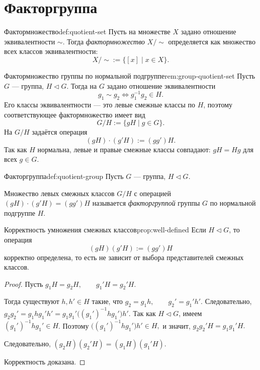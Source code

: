 
\section{Факторгруппа}

\begin{Definition}{Фактормножество}{def:quotient-set}
	Пусть на множестве $X$ задано отношение эквивалентности $\sim$. Тогда \emph{фактормножество} $X/{\sim}$ определяется как множество всех классов эквивалентности:
	\[
	X/{\sim}:=\{[x] \mid x\in X\}.
	\]
\end{Definition}

\begin{Remark}{Фактормножество группы по нормальной подгруппе}{rem:group-quotient-set}
	Пусть $G$ --- группа, $H \triangleleft G$. Тогда на $G$ задано отношение эквивалентности
	\[
	g_1\sim g_2 \Longleftrightarrow g_1^{-1}g_2\in H.
	\]
	Его классы эквивалентности --- это левые смежные классы по $H$, поэтому соответствующее фактормножество имеет вид
	\[
	G/H:=\{gH\mid g\in G\}.
	\]
	На $G/H$ задаётся операция
	\[
	(gH)\cdot(g'H):=(gg')H.
	\]
	Так как $H$ нормальна, левые и правые смежные классы совпадают: $gH=Hg$ для всех $g\in G$.
\end{Remark}

\begin{Definition}{Факторгруппа}{def:quotient-group}
	Пусть $G$ — группа, $H \triangleleft G$.

	Множество левых смежных классов $G/H$ с операцией $(gH) \cdot (g'H) = (gg')H$ называется \emph{факторгруппой} группы $G$ по нормальной подгруппе $H$.
\end{Definition}

\begin{Proposition}{Корректность умножения смежных классов}{prop:well-defined}
	Если $H \triangleleft G$, то операция
	\[
	(gH)(g'H) := (gg')H
	\]
	корректно определена, то есть не зависит от выбора представителей смежных классов.
\end{Proposition}

\begin{proof}
	Пусть $g_1H=g_2H, \qquad g_1'H=g_2'H$.

	Тогда существуют $h,h'\in H$ такие, что $g_2=g_1h, \qquad g_2'=g_1'h'$. Следовательно, $g_2g_2' = g_1 h g_1' h' = g_1 g_1'\bigl((g_1')^{-1} h g_1'\bigr)h'$. Так как $H \triangleleft G$, имеем $(g_1')^{-1} h g_1' \in H$. Поэтому $\bigl((g_1')^{-1} h g_1'\bigr)h' \in H,$ и значит, $g_2g_2'H = g_1g_1'H.$

	Следовательно, $(g_2H)(g_2'H)=(g_1H)(g_1'H).$

	Корректность доказана.
\end{proof}

